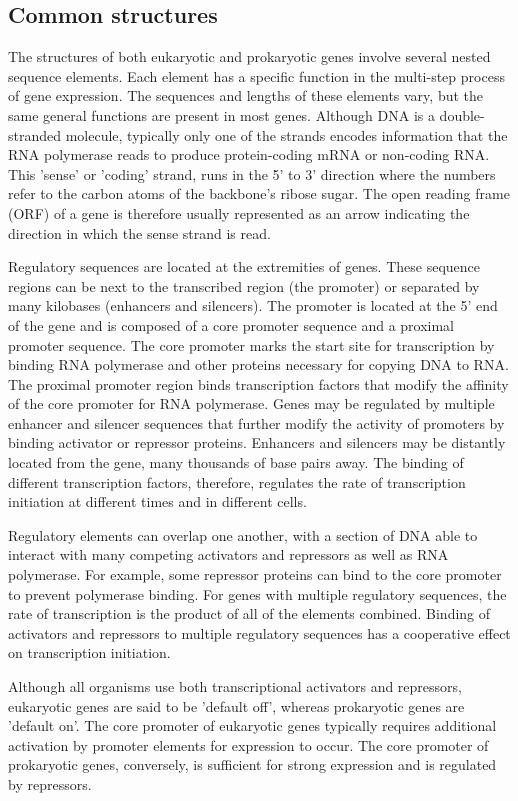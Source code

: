 \subsection{Common structures}
The structures of both eukaryotic and prokaryotic genes involve several nested sequence elements. Each element has a specific 
function in the multi-step process of gene expression. The sequences and lengths of these elements vary, but the same general 
functions are present in most genes. Although DNA is a double-stranded molecule, typically only one of the strands encodes 
information that the RNA polymerase reads to produce protein-coding mRNA or non-coding RNA. This 'sense' or 'coding' strand, 
runs in the 5' to 3' direction where the numbers refer to the carbon atoms of the backbone's ribose sugar. The open reading frame (ORF) 
of a gene is therefore usually represented as an arrow indicating the direction in which the sense strand is read.  

Regulatory sequences are located at the extremities of genes. These sequence regions can be next to the transcribed region 
(the promoter) or separated by many kilobases (enhancers and silencers). The promoter is located at the 5' end of the gene 
and is composed of a core promoter sequence and a proximal promoter sequence. The core promoter marks the start site for 
transcription by binding RNA polymerase and other proteins necessary for copying DNA to RNA. The proximal promoter region 
binds transcription factors that modify the affinity of the core promoter for RNA polymerase. Genes may be regulated by 
multiple enhancer and silencer sequences that further modify the activity of promoters by binding activator or repressor 
proteins. Enhancers and silencers may be distantly located from the gene, many thousands of base pairs away. The binding 
of different transcription factors, therefore, regulates the rate of transcription initiation at different times and in 
different cells.  

Regulatory elements can overlap one another, with a section of DNA able to interact with many competing activators and repressors 
as well as RNA polymerase. For example, some repressor proteins can bind to the core promoter to prevent polymerase binding. For 
genes with multiple regulatory sequences, the rate of transcription is the product of all of the elements combined. Binding of 
activators and repressors to multiple regulatory sequences has a cooperative effect on transcription initiation.  

Although all organisms use both transcriptional activators and repressors, eukaryotic genes are said to be 'default off', 
whereas prokaryotic genes are 'default on'. The core promoter of eukaryotic genes typically requires additional activation 
by promoter elements for expression to occur. The core promoter of prokaryotic genes, conversely, is sufficient for strong 
expression and is regulated by repressors.  

